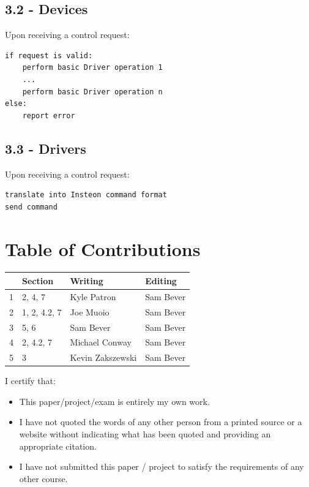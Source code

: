 \documentclass{article}
\begin{document}
\subsection*{3.2 - Devices}

Upon receiving a control request:

\begin{lstlisting}
if request is valid:
    perform basic Driver operation 1
    ...
    perform basic Driver operation n
else:
    report error
\end{lstlisting}

\subsection*{3.3 - Drivers}

Upon receiving a control request:

\begin{lstlisting}
translate into Insteon command format
send command
\end{lstlisting}

\newpage

\section*{\centering Table of Contributions}
\begin{tabular}{| l | l | l | l |}
    \hline
     & Section & Writing & Editing \\
    \hline \hline
		1 & 2, 4, 7 & Kyle Patron & Sam Bever \\ \hline
		2 & 1, 2, 4.2, 7 & Joe Muoio & Sam Bever \\ \hline
		3 & 5, 6 & Sam Bever &  Sam Bever \\ \hline
		4 & 2, 4.2, 7 & Michael Conway &  Sam Bever \\ \hline
		5 & 3 & Kevin Zakszewski & Sam Bever \\ \hline
\end{tabular}
\newpage
\noindent I certify that:
\begin{itemize}
\item This paper/project/exam is entirely my own work.
\item I have not quoted the words of any other person from a printed source or a website without indicating what has been quoted and providing an appropriate citation.
\item I have not submitted this paper / project to satisfy the requirements of any other course.
\end{itemize}
\end{document}
